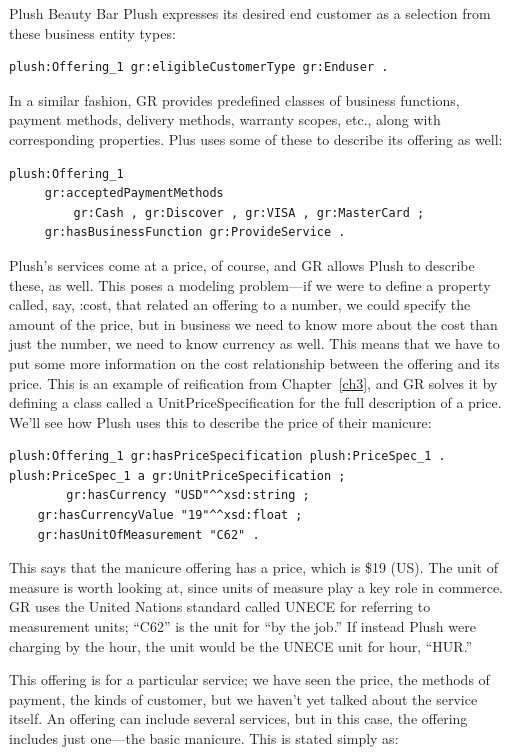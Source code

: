 \begin{example}{Plush Beauty Bar}
Plush expresses its desired end customer as a selection from these
business entity types:

\begin{lstlisting}
plush:Offering_1 gr:eligibleCustomerType gr:Enduser .
\end{lstlisting}

In a similar fashion, GR provides predefined classes of business
functions, payment methods, delivery methods, warranty scopes, etc.,
along with corresponding properties. Plus uses some of these to describe
its offering as well:

\begin{lstlisting}
plush:Offering_1
     gr:acceptedPaymentMethods
         gr:Cash , gr:Discover , gr:VISA , gr:MasterCard ;
     gr:hasBusinessFunction gr:ProvideService .
\end{lstlisting}

Plush's services come at a price, of course, and GR allows Plush to
describe these, as well. This poses a modeling problem---if we were to
define a property called, say, :cost, that related an offering to a
number, we could specify the amount of the price, but in business we
need to know more about the cost than just the number, we need to know
currency as well. This means that we have to put some more information
on the cost relationship between the offering and its price. This is an
example of reification from Chapter~\ref{ch3}, and GR solves it by defining a
class called a UnitPriceSpecification for the full description of a
price. We'll see how Plush uses this to describe the price of their
manicure:

\begin{lstlisting}
plush:Offering_1 gr:hasPriceSpecification plush:PriceSpec_1 .
plush:PriceSpec_1 a gr:UnitPriceSpecification ;
        gr:hasCurrency "USD"^^xsd:string ; 
	gr:hasCurrencyValue "19"^^xsd:float ; 
	gr:hasUnitOfMeasurement "C62" .
\end{lstlisting}

This says that the manicure offering has a price, which is \$19 (US).
The unit of measure is worth looking at, since units of measure play a
key role in commerce. GR uses the United Nations standard called UNECE
for referring to measurement units; ``C62'' is the unit for ``by the
job.'' If instead Plush were charging by the hour, the unit would be the
UNECE unit for hour, ``HUR.''

This offering is for a particular service; we have seen the price, the
methods of payment, the kinds of
customer, but we haven't yet talked about the service itself. An
offering can include several services, but in this case, the offering
includes just one---the basic manicure. This is stated simply as:


\end{example}
